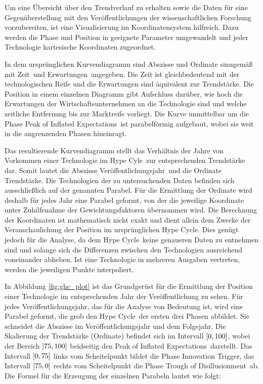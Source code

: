 Um eine Übersicht über den Trendverlauf zu erhalten sowie die Daten für eine Gegenüberstellung mit den Veröffentlichungen der wissenschaftlichen Forschung vorzubereiten, ist eine Visualisierung im Koordinatensystem hilfreich. Dazu werden die Phase und Position in geeignete Parameter umgewandelt und jeder Technologie kartesische Koordinaten zugeordnet.

In dem ursprünglichen Kurvendiagramm sind Abszisse und Ordinate sinngemäß mit \glqq Zeit\grqq~und \glqq Erwartungen\grqq~angegeben. Die Zeit ist gleichbedeutend mit der technologischen Reife und die Erwartungen sind äquivalent zur Trendstärke. Die Position in einem einzelnen Diagramm gibt Aufschluss darüber, wie hoch die Erwartungen der Wirtschaftsunternehmen an die Technologie sind und welche zeitliche Entfernung bis zur Marktreife vorliegt. Die Kurve unmittelbar um die Phase \glqq Peak of Inflated Expectations\grqq~ist parabelförmig aufgebaut, wobei sie weit in die angrenzenden Phasen hineinragt.

Das resultierende Kurvendiagramm stellt das Verhältnis der Jahre von Vorkommen einer Technologie im \glqq Hype Cyle\grqq~zur entsprechenden Trendstärke dar. Somit lautet die Abszisse \glqq Veröffentlichungsjahr\grqq~und die Ordinate \glqq Trendstärke\grqq. Die Technologien der zu untersuchenden Daten befinden sich ausschließlich auf der genannten Parabel. Für die Ermittlung der Ordinate wird deshalb für jedes Jahr eine Parabel geformt, von der die jeweilige Koordinate unter Zuhilfenahme der Gewichtungsfaktoren übernommen wird. Die Berechnung der Koordinaten ist mathematisch nicht exakt und dient allein dem Zwecke der Veranschaulichung der Position im ursprünglichen \glqq Hype Cycle\grqq. Dies genügt jedoch für die Analyse, da dem \glqq Hype Cycle\grqq~keine genaueren Daten zu entnehmen sind und solange sich die Differenzen zwischen den Technologien ausreichend voneinander abheben. Ist eine Technologie in mehreren Ausgaben vertreten, werden die jeweiligen Punkte interpoliert.

In Abbildung \ref{fig:ghc_plot} ist das Grundgerüst für die Ermittlung der Position einer Technologie im entsprechenden Jahr der Veröffentlichung zu sehen. Für jedes Veröffentlichungsjahr, das für die Analyse von Bedeutung ist, wird eine Parabel geformt, die grob den \glqq Hype Cycle\grqq~der ersten drei Phasen abbildet. Sie schneidet die Abszisse im Veröffentlichungsjahr und dem Folgejahr. Die Skalierung der Trendstärke (Ordinate) befindet sich im Intervall $\interval{0}{100}$, wobei der Bereich $\interval[open left]{75}{100}$ beidseitig den \glqq Peak of Inflated Expectations\grqq~darstellt. Das Intervall $\interval[open left]{0}{75}$ links vom Scheitelpunkt bildet die Phase \glqq Innovation Trigger\grqq, das Intervall $\interval[open left]{75}{0}$ rechts vom Scheitelpunkt die Phase \glqq Trough of Disillusionment\grqq~ab. Die Formel für die Erzeugung der einzelnen Parabeln lautet wie folgt:

